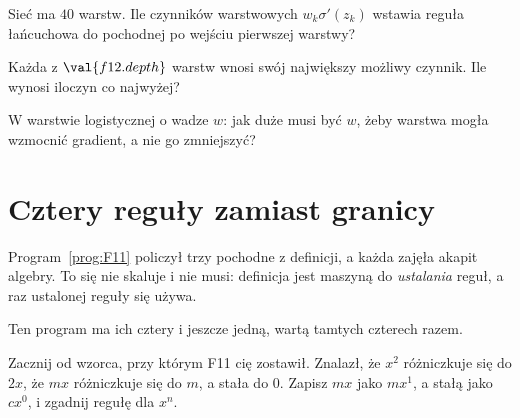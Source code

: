 \begin{quiz}
\item Sieć ma $\num{40}$ warstw. Ile czynników warstwowych
  $w_k\sigma'(z_k)$ wstawia reguła łańcuchowa do pochodnej po wejściu
  pierwszej warstwy?
\item Każda z $\val{f12.depth}$ warstw wnosi swój największy możliwy
  czynnik. Ile wynosi iloczyn co najwyżej? 
\item W warstwie logistycznej o wadze $w$: jak duże musi być $w$, żeby
  warstwa mogła wzmocnić gradient, a nie go zmniejszyć? 
\end{quiz}

\section{Cztery reguły zamiast granicy}
\label{sec:F12-rules}

\begin{fr}
Program~\ref{prog:F11} policzył trzy pochodne z definicji, a każda zajęła
akapit algebry. To się nie skaluje i nie musi: definicja jest maszyną do
\emph{ustalania} reguł, a raz ustalonej reguły się używa.

Ten program ma ich cztery i jeszcze jedną, wartą tamtych czterech razem.

Zacznij od wzorca, przy którym F11 cię zostawił. Znalazł, że $x^{2}$
różniczkuje się do $2x$, że $mx$ różniczkuje się do $m$, a stała do $0$.
Zapisz $mx$ jako $mx^{1}$, a stałą jako $cx^{0}$, i zgadnij regułę dla
$x^{n}$.
\dotline
\nextframe
\end{fr}

